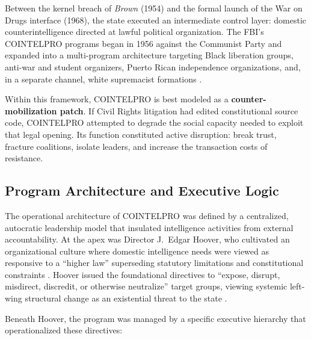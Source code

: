 Between the kernel breach of \textit{Brown} (1954) and the formal launch of the War on Drugs interface (1968), the state executed an intermediate control layer: domestic counterintelligence directed at lawful political organization. The FBI's COINTELPRO programs began in 1956 against the Communist Party and expanded into a multi-program architecture targeting Black liberation groups, anti-war and student organizers, Puerto Rican independence organizations, and, in a separate channel, white supremacist formations \cite{fbi_cointelpro_vault, fbi_new_left_vault, fbi_white_hate_vault}.

Within this framework, COINTELPRO is best modeled as a \textbf{counter-mobilization patch}. If Civil Rights litigation had edited constitutional source code, COINTELPRO attempted to degrade the social capacity needed to exploit that legal opening. Its function constituted active disruption: break trust, fracture coalitions, isolate leaders, and increase the transaction costs of resistance.

\subsection{Program Architecture and Executive Logic}

The operational architecture of COINTELPRO was defined by a centralized, autocratic leadership model that insulated intelligence activities from external accountability. At the apex was Director J.\ Edgar Hoover, who cultivated an organizational culture where domestic intelligence needs were viewed as responsive to a ``higher law'' superseding statutory limitations and constitutional constraints \cite{fbi_cointelpro_vault}. Hoover issued the foundational directives to ``expose, disrupt, misdirect, discredit, or otherwise neutralize'' target groups, viewing systemic left-wing structural change as an existential threat to the state \cite{church_book2_1976}.

Beneath Hoover, the program was managed by a specific executive hierarchy that operationalized these directives:

